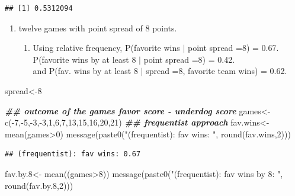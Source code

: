 \documentclass[
]{book}
\newenvironment{Shaded}{\begin{snugshade}}{\end{snugshade}}
\newcommand{\DecValTok}[1]{\textcolor[rgb]{0.00,0.00,0.81}{#1}}
\newcommand{\DocumentationTok}[1]{\textcolor[rgb]{0.56,0.35,0.01}{\textbf{\textit{#1}}}}
\newcommand{\FloatTok}[1]{\textcolor[rgb]{0.00,0.00,0.81}{#1}}
\newcommand{\FunctionTok}[1]{\textcolor[rgb]{0.00,0.00,0.00}{#1}}
\newcommand{\NormalTok}[1]{#1}
\newcommand{\OtherTok}[1]{\textcolor[rgb]{0.56,0.35,0.01}{#1}}
\newcommand{\SpecialCharTok}[1]{\textcolor[rgb]{0.00,0.00,0.00}{#1}}
\newcommand{\StringTok}[1]{\textcolor[rgb]{0.31,0.60,0.02}{#1}}
\providecommand{\tightlist}{%
  \setlength{\itemsep}{0pt}\setlength{\parskip}{0pt}}
\theoremstyle{definition}
\theoremstyle{definition}
\theoremstyle{definition}
\theoremstyle{definition}
\theoremstyle{remark}
\begin{document}
\begin{verbatim}
## [1] 0.5312094
\end{verbatim}

\begin{enumerate}
\def\labelenumi{\arabic{enumi}.}
\setcounter{enumi}{3}
\tightlist
\item
  twelve games with point spread of 8 points.

  \begin{enumerate}
  \def\labelenumii{(\alph{enumii})}
  \tightlist
  \item
    Using relative frequency, P(favorite wins \(|\) point spread =8) = 0.67.\\
    P(favorite wins by at least 8 \(|\) point spread =8) = 0.42.\\
    and P(fav. wins by at least 8 \(|\) spread =8, favorite team wins) = 0.62.
  \end{enumerate}
\end{enumerate}

\begin{Shaded}
\begin{Highlighting}[]
\NormalTok{spread}\OtherTok{\textless{}{-}}\DecValTok{8}

\DocumentationTok{\#\# outcome of the games favor score {-} underdog score}
\NormalTok{ games}\OtherTok{\textless{}{-}}\FunctionTok{c}\NormalTok{(}\SpecialCharTok{{-}}\DecValTok{7}\NormalTok{,}\SpecialCharTok{{-}}\DecValTok{5}\NormalTok{,}\SpecialCharTok{{-}}\DecValTok{3}\NormalTok{,}\SpecialCharTok{{-}}\DecValTok{3}\NormalTok{,}\DecValTok{1}\NormalTok{,}\DecValTok{6}\NormalTok{,}\DecValTok{7}\NormalTok{,}\DecValTok{13}\NormalTok{,}\DecValTok{15}\NormalTok{,}\DecValTok{16}\NormalTok{,}\DecValTok{20}\NormalTok{,}\DecValTok{21}\NormalTok{)}
\DocumentationTok{\#\# frequentist approach}
\NormalTok{ fav.wins}\OtherTok{\textless{}{-}}  \FunctionTok{mean}\NormalTok{(games}\SpecialCharTok{\textgreater{}}\DecValTok{0}\NormalTok{)}
 \FunctionTok{message}\NormalTok{(}\FunctionTok{paste0}\NormalTok{(}\StringTok{"(frequentist): fav wins: "}\NormalTok{, }\FunctionTok{round}\NormalTok{(fav.wins,}\DecValTok{2}\NormalTok{)))}
\end{Highlighting}
\end{Shaded}

\begin{verbatim}
## (frequentist): fav wins: 0.67
\end{verbatim}

\begin{Shaded}
\begin{Highlighting}[]
\NormalTok{ fav.by}\FloatTok{.8}\OtherTok{\textless{}{-}} \FunctionTok{mean}\NormalTok{((games}\SpecialCharTok{\textgreater{}}\DecValTok{8}\NormalTok{))}
  \FunctionTok{message}\NormalTok{(}\FunctionTok{paste0}\NormalTok{(}\StringTok{"(frequentist): fav wins by 8: "}\NormalTok{, }\FunctionTok{round}\NormalTok{(fav.by}\FloatTok{.8}\NormalTok{,}\DecValTok{2}\NormalTok{)))}
\end{Highlighting}
\end{Shaded}
\end{document}
